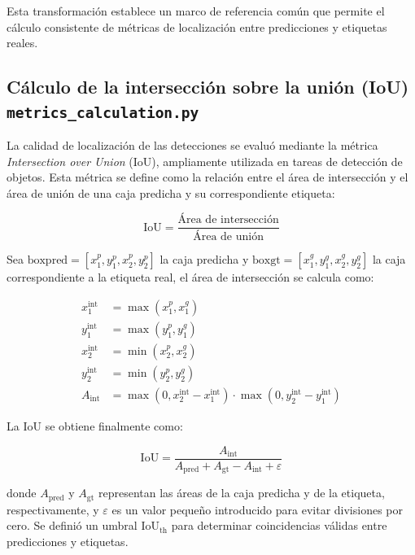 \documentclass{article}
\begin{document}
	Esta transformación establece un marco de referencia común que permite el cálculo consistente de métricas de localización entre predicciones y etiquetas reales.
	
	\subsection{Cálculo de la intersección sobre la unión (IoU) \texttt{metrics\_calculation.py}}
	
	La calidad de localización de las detecciones se evaluó mediante la métrica \textit{Intersection over Union} (IoU), ampliamente utilizada en tareas de detección de objetos. Esta métrica se define como la relación entre el área de intersección y el área de unión de una caja predicha y su correspondiente etiqueta:
	
	\begin{equation}
		\text{IoU} = \frac{\text{Área de intersección}}{\text{Área de unión}}
	\end{equation}
	
	Sea $\text{box}{\text{pred}} = [x_1^{p}, y_1^{p}, x_2^{p}, y_2^{p}]$ la caja predicha y $\text{box}{\text{gt}} = [x_1^{g}, y_1^{g}, x_2^{g}, y_2^{g}]$ la caja correspondiente a la etiqueta real, el área de intersección se calcula como:
	
	\begin{align}
		x_1^{\text{int}} &= \max(x_1^{p}, x_1^{g}) \\
		y_1^{\text{int}} &= \max(y_1^{p}, y_1^{g}) \\
		x_2^{\text{int}} &= \min(x_2^{p}, x_2^{g}) \\
		y_2^{\text{int}} &= \min(y_2^{p}, y_2^{g}) \\
		A_{\text{int}} &= \max(0, x_2^{\text{int}} - x_1^{\text{int}}) \cdot \max(0, y_2^{\text{int}} - y_1^{\text{int}})
	\end{align}
	
	La IoU se obtiene finalmente como:
	
	\begin{equation}
		\text{IoU} = \frac{A_{\text{int}}}{A_{\text{pred}} + A_{\text{gt}} - A_{\text{int}}+\varepsilon}
	\end{equation}
	
	donde $A_{\text{pred}}$ y $A_{\text{gt}}$ representan las áreas de la caja predicha y de la etiqueta, respectivamente, y $\varepsilon$ es un valor pequeño introducido para evitar divisiones por cero. Se definió un umbral $\text{IoU}_{\text{th}}$ para determinar coincidencias válidas entre predicciones y etiquetas.
	
\end{document}
